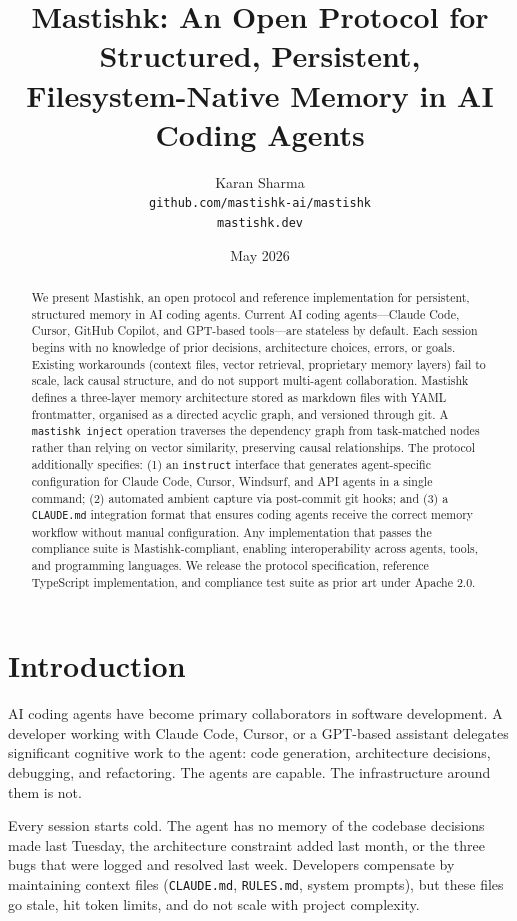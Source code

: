 \documentclass[11pt]{article}
\title{\textbf{Mastishk: An Open Protocol for Structured, Persistent,\\
Filesystem-Native Memory in AI Coding Agents}}
\author{
  Karan Sharma\\
  \texttt{github.com/mastishk-ai/mastishk}\\
  \texttt{mastishk.dev}
}
\date{May 2026}
\begin{document}
\maketitle

\begin{abstract}
We present Mastishk, an open protocol and reference implementation for persistent, structured memory in AI coding agents. Current AI coding agents---Claude Code, Cursor, GitHub Copilot, and GPT-based tools---are stateless by default. Each session begins with no knowledge of prior decisions, architecture choices, errors, or goals. Existing workarounds (context files, vector retrieval, proprietary memory layers) fail to scale, lack causal structure, and do not support multi-agent collaboration. Mastishk defines a three-layer memory architecture stored as markdown files with YAML frontmatter, organised as a directed acyclic graph, and versioned through git. A \texttt{mastishk inject} operation traverses the dependency graph from task-matched nodes rather than relying on vector similarity, preserving causal relationships. The protocol additionally specifies: (1) an \texttt{instruct} interface that generates agent-specific configuration for Claude Code, Cursor, Windsurf, and API agents in a single command; (2) automated ambient capture via post-commit git hooks; and (3) a \texttt{CLAUDE.md} integration format that ensures coding agents receive the correct memory workflow without manual configuration. Any implementation that passes the compliance suite is Mastishk-compliant, enabling interoperability across agents, tools, and programming languages. We release the protocol specification, reference TypeScript implementation, and compliance test suite as prior art under Apache 2.0.
\end{abstract}

\section{Introduction}

AI coding agents have become primary collaborators in software development. A developer working with Claude Code, Cursor, or a GPT-based assistant delegates significant cognitive work to the agent: code generation, architecture decisions, debugging, and refactoring. The agents are capable. The infrastructure around them is not.

Every session starts cold. The agent has no memory of the codebase decisions made last Tuesday, the architecture constraint added last month, or the three bugs that were logged and resolved last week. Developers compensate by maintaining context files (\texttt{CLAUDE.md}, \texttt{RULES.md}, system prompts), but these files go stale, hit token limits, and do not scale with project complexity.
\end{document}
